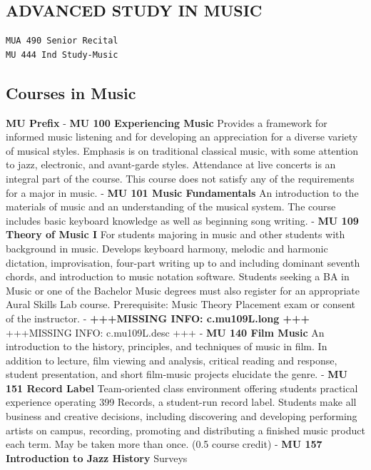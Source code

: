 \documentclass[
  letterpaper,
]{scrbook}
\begin{document}
\subsection{ADVANCED STUDY IN MUSIC}\label{advanced-study-in-music}

\begin{verbatim}
MUA 490 Senior Recital
MU 444 Ind Study-Music
\end{verbatim}

\subsection{Courses in Music}\label{courses-in-music}

\textbf{MU Prefix} - \textbf{MU 100 Experiencing Music} Provides a
framework for informed music listening and for developing an
appreciation for a diverse variety of musical styles. Emphasis is on
traditional classical music, with some attention to jazz, electronic,
and avant-garde styles. Attendance at live concerts is an integral part
of the course. This course does not satisfy any of the requirements for
a major in music. - \textbf{MU 101 Music Fundamentals} An introduction
to the materials of music and an understanding of the musical system.
The course includes basic keyboard knowledge as well as beginning song
writing. - \textbf{MU 109 Theory of Music I} For students majoring in
music and other students with background in music. Develops keyboard
harmony, melodic and harmonic dictation, improvisation, four-part
writing up to and including dominant seventh chords, and introduction to
music notation software. Students seeking a BA in Music or one of the
Bachelor Music degrees must also register for an appropriate Aural
Skills Lab course. Prerequisite: Music Theory Placement exam or consent
of the instructor. - \textbf{+++MISSING INFO: c.mu109L.long +++}
+++MISSING INFO: c.mu109L.desc +++ - \textbf{MU 140 Film Music} An
introduction to the history, principles, and techniques of music in
film. In addition to lecture, film viewing and analysis, critical
reading and response, student presentation, and short film-music
projects elucidate the genre. - \textbf{MU 151 Record Label}
Team-oriented class environment offering students practical experience
operating 399 Records, a student-run record label. Students make all
business and creative decisions, including discovering and developing
performing artists on campus, recording, promoting and distributing a
finished music product each term. May be taken more than once. (0.5
course credit) - \textbf{MU 157 Introduction to Jazz History} Surveys
\end{document}
